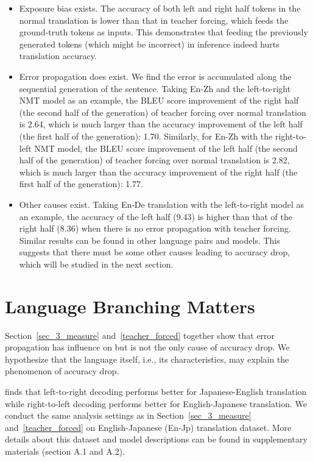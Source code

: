 \documentclass[11pt,a4paper]{article}
\begin{document}
\begin{itemize}
\item Exposure bias exists. The accuracy of both left and right half tokens in the normal translation is lower than that in  teacher forcing, which feeds the ground-truth tokens as inputs. This demonstrates that feeding the previously generated tokens (which might be incorrect) in inference indeed hurts translation accuracy.

\item Error propagation does exist. We find the error is accumulated along the sequential generation of the sentence. Taking En-Zh and the left-to-right NMT model as an example, the BLEU score improvement of the right half (the second half of the generation) of teacher forcing over normal translation is 2.64, which is much larger than the accuracy improvement of the left half (the first half of the generation): 1.70. Similarly, for En-Zh with the right-to-left NMT model, the BLEU score improvement of the left half (the second half of the generation) of teacher forcing over normal translation is 2.82, which is much larger than the accuracy improvement of the right half (the first half of the generation): 1.77.
\item Other causes exist. Taking En-De translation with the left-to-right model as an example, the accuracy of the left half (9.43) is higher than that of the right half (8.36) when there is no error propagation with teacher forcing. Similar results can be found in other language pairs and models. This suggests that there must be some other causes leading to accuracy drop, which will be studied in the next section.
\end{itemize}



\section{Language Branching Matters}
\label{language}
Section~\ref{sec_3_measure} and~\ref{teacher_forced} together show that error propagation has influence on but is not the only cause of accuracy drop. We hypothesize that the language itself, i.e., its characteristics, may explain the phenomenon of accuracy drop.

\citet{DBLP:conf/coling/WatanabeS02} finds that left-to-right decoding performs better for Japanese-English translation while right-to-left decoding performs better for English-Japanese translation. We conduct the same analysis settings as in Section~\ref{sec_3_measure} and~\ref{teacher_forced} on English-Japanese (En-Jp) translation dataset. More details about this dataset and model descriptions can be found in supplementary materials (section A.1 and A.2).
\end{document}
